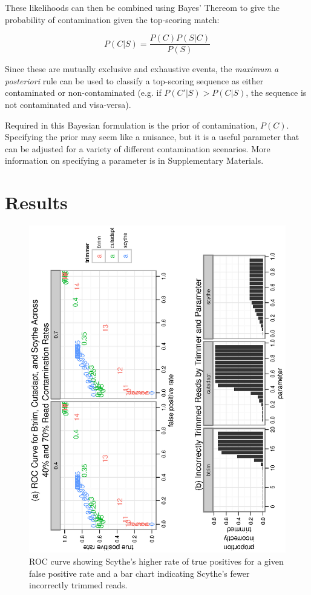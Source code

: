 \documentclass{bioinfo}
\begin{document}
\begin{methods}
These likelihoods can then be combined using Bayes' Thereom to give
the probability of contamination given the top-scoring match:

$$ P(C|S) = \frac{P(C) P(S|C)}{P(S)} $$

Since these are mutually exclusive and exhaustive events, the
\emph{maximum a posteriori} rule can be used to classify a top-scoring
sequence as either contaminated or non-contaminated (e.g. if $P(C'|S)
> P(C|S)$, the sequence is not contaminated and visa-versa).

Required in this Bayesian formulation is the prior of contamination,
$P(C)$. Specifying the prior may seem like a nuisance, but it is a
useful parameter that can be adjusted for a variety of different
contamination scenarios. More information on specifying a parameter is
in Supplementary Materials.

\section{Results}
\begin{centering}
\begin{figure}[!tpb]
\includegraphics[angle=-90]{graphics/roc-and-incorrect-trimmed.eps}
\caption{ROC curve showing Scythe's higher rate of true positives for
  a given false positive rate and a bar chart indicating Scythe's
  fewer incorrectly trimmed reads.}\label{fig:02}
\end{figure}
\end{centering}


\end{methods}
\end{document}
